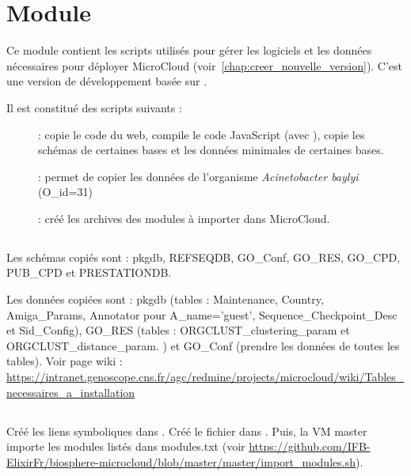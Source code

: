 \chapter{Module \micWEBdeployVer} 

Ce module contient les scripts utilisés pour gérer les logiciels et les données nécessaires pour déployer MicroCloud (voir~\autoref{chap:creer_nouvelle_version}).
C'est une version de développement basée sur .

Il est constitué des scripts suivants :
\begin{description}
	\item[] : copie le code du web, compile le code JavaScript (avec ), copie les schémas de certaines bases et les données minimales de certaines bases.
	\item[] : permet de copier les données de l'organisme \textit{Acinetobacter baylyi} (O\_id=31)
	\item[]: créé les archives des modules à importer dans MicroCloud.
\end{description}

\section{}

Les schémas copiés sont : pkgdb, REFSEQDB, GO\_Conf, GO\_RES, GO\_CPD, PUB\_CPD et PRESTATIONDB.
\newline

Les données copiées sont : pkgdb (tables : Maintenance, Country, Amiga\_Params,
Annotator pour A\_name='guest', Sequence\_Checkpoint\_Desc et Sid\_Config), GO\_RES (tables : ORGCLUST\_clustering\_param et ORGCLUST\_distance\_param.
) et GO\_Conf (prendre les données de toutes les tables). Voir page wiki : \url{https://intranet.genoscope.cns.fr/agc/redmine/projects/microcloud/wiki/Tables_necessaires_a_installation}


\section{}

Créé les liens symboliques dans .
Créé le fichier  dans .
\newline
Puis, la VM master importe les modules listés dans modules.txt (voir \url{https://github.com/IFB-ElixirFr/biosphere-microcloud/blob/master/master/import_modules.sh}).


